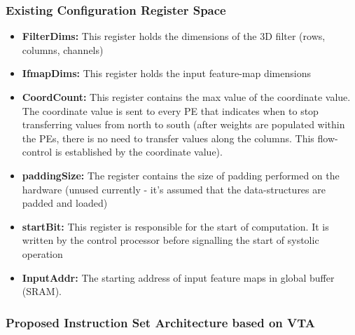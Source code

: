 \subsubsection{Existing Configuration Register Space}
    \begin{itemize}
        \item \textbf{FilterDims:} This register holds the dimensions of the 3D filter (rows, columns, channels)
        \item \textbf{IfmapDims:} This register holds the input feature-map dimensions 
        \item \textbf{CoordCount:} This register contains the max value of the coordinate value. The coordinate value is sent to every PE that indicates when to stop transferring values from north to south (after weights are populated within the PEs, there is no need to transfer values along the columns. This flow-control is established by the coordinate value).
        \item \textbf{paddingSize:} The register contains the size of padding performed on the hardware (unused currently - it's assumed that the data-structures are padded and loaded)
        \item \textbf{startBit:} This register is responsible for the start of computation. It is written by the control processor before signalling the start of systolic operation
        \item \textbf{InputAddr:} The starting address of input feature maps in global buffer (SRAM).
    \end{itemize}
    
\subsubsection{Proposed Instruction Set Architecture based on VTA}

